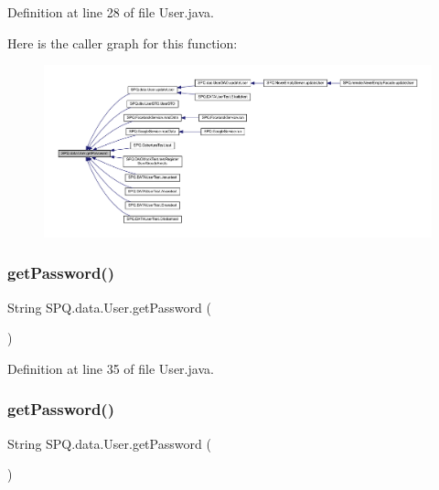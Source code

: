 Definition at line 28 of file User.\+java.

Here is the caller graph for this function\+:
\nopagebreak
\begin{figure}[H]
\begin{center}
\leavevmode
\includegraphics[width=350pt]{class_s_p_q_1_1data_1_1_user_a688c1eadd21594d52967d87289e23ce2_icgraph}
\end{center}
\end{figure}
\mbox{\label{class_s_p_q_1_1data_1_1_user_a688c1eadd21594d52967d87289e23ce2}} 
\subsubsection{\texorpdfstring{get\+Password()}{getPassword()}\hspace{0.1cm}{\footnotesize\ttfamily [3/4]}}
{\footnotesize\ttfamily String S\+P\+Q.\+data.\+User.\+get\+Password (\begin{DoxyParamCaption}{ }\end{DoxyParamCaption})}



Definition at line 35 of file User.\+java.

\mbox{\label{class_s_p_q_1_1data_1_1_user_a688c1eadd21594d52967d87289e23ce2}} 
\subsubsection{\texorpdfstring{get\+Password()}{getPassword()}\hspace{0.1cm}{\footnotesize\ttfamily [4/4]}}
{\footnotesize\ttfamily String S\+P\+Q.\+data.\+User.\+get\+Password (\begin{DoxyParamCaption}{ }\end{DoxyParamCaption})}



